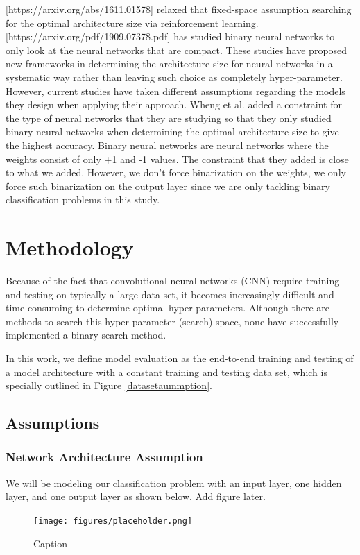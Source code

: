 \documentclass[conference]{IEEEtran}
\begin{document}
[https://arxiv.org/abs/1611.01578] relaxed that fixed-space assumption searching for the optimal architecture size via reinforcement learning. [https://arxiv.org/pdf/1909.07378.pdf] has studied binary neural networks to only look at the neural networks that are compact. These studies have proposed new frameworks in determining the architecture size for neural networks in a systematic way rather than leaving such choice as completely hyper-parameter. However, current studies have taken different assumptions regarding the models they design when applying their approach. Wheng et al. added a constraint for the type of neural networks that they are studying so that they only studied binary neural networks when determining the optimal architecture size to give the highest accuracy. Binary neural networks are neural networks where the weights consist of only +1 and -1 values.
The constraint that they added is close to what we added. However, we don't force binarization on the weights, we only force such binarization on the output layer since we are only tackling binary classification problems in this study.

 
\section{Methodology} \label{methodology}

Because of the fact that convolutional neural networks (CNN) require training and testing on typically a large data set, it becomes increasingly difficult and time consuming to determine optimal hyper-parameters. Although there are methods to search this hyper-parameter (search) space, none have successfully implemented a binary search method. 

In this work, we define model evaluation as the end-to-end training and testing of a model architecture with a constant training and testing data set, which is specially outlined in Figure \autoref{datasetaummption}. 



\subsection{Assumptions}
\subsubsection{Network Architecture Assumption}
We will be modeling our classification problem with an input layer, one hidden layer, and one output layer as shown below.
Add figure later.
\begin{figure}[H]
    \centering
    \texttt{[image: figures/placeholder.png]}
    \caption{Caption}
    \label{fig:my_label}
\end{figure}
\end{document}
